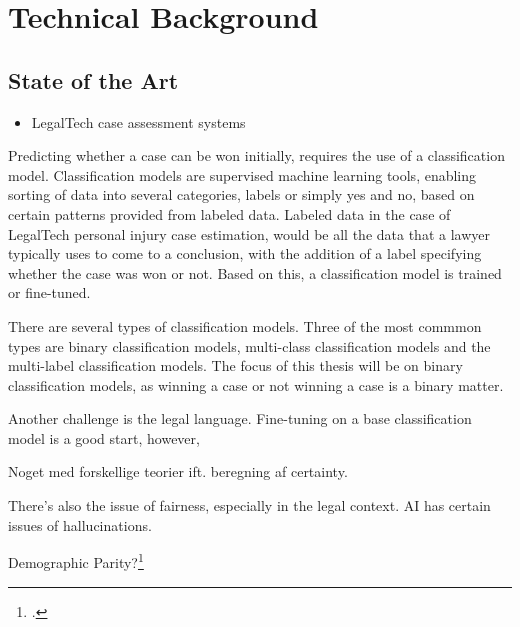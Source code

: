 \section{Technical Background}
\subsection{State of the Art}
\begin{itemize}
  \item LegalTech case assessment systems
\end{itemize}



Predicting whether a case can be won initially, requires the use of a classification model. Classification models are supervised machine learning tools, enabling sorting of data into several categories, labels or simply yes and no, based on certain patterns provided from labeled data. Labeled data in the case of LegalTech personal injury case estimation, would be all the data that a lawyer typically uses to come to a conclusion, with the addition of a label specifying whether the case was won or not. Based on this, a classification model is trained or fine-tuned.

There are several types of classification models. Three of the most commmon types are binary classification models, multi-class classification models and the multi-label classification models. The focus of this thesis will be on binary classification models, as winning a case or not winning a case is a binary matter.




Another challenge is the legal language. Fine-tuning on a base classification model is a good start, however,

Noget med forskellige teorier ift. beregning af certainty.

There's also the issue of fairness, especially in the legal context. AI has certain issues of hallucinations.

Demographic Parity?\footcite{del_bue_fairness_2025}


